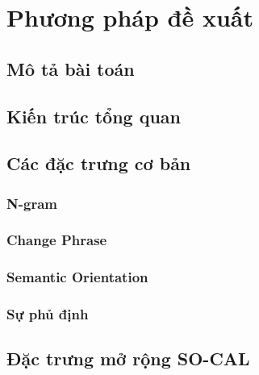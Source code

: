 \section{Phương pháp đề xuất}
\subsection{Mô tả bài toán}
\subsection{Kiến trúc tổng quan}
\subsection{Các đặc trưng cơ bản}
\subsubsection*{N-gram}
\subsubsection*{Change Phrase}
\subsubsection*{Semantic Orientation}
\subsubsection*{Sự phủ định}
\subsection{Đặc trưng mở rộng SO-CAL}